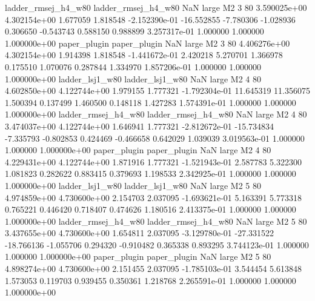 ladder_rmsej_h4_w80 ladder_rmsej_h4_w80                   NaN      large       M2                 3 80 3.590025e+00   4.302154e+00      1.677059       1.818548 -2.152390e-01    -16.552855     -7.780306    -1.028936       0.306650 -0.543743   0.588150     0.988899   3.257317e-01            1.000000        1.000000        1.000000e+00
       paper_plugin        paper_plugin                   NaN      large       M2                 3 80 4.406276e+00   4.302154e+00      1.914398       1.818548 -1.441672e-01      2.420218      5.270701     1.366978       0.175510  1.070076   0.287844     1.334970   1.857206e-01            1.000000        1.000000        1.000000e+00
    ladder_lsj1_w80     ladder_lsj1_w80                   NaN      large       M2                 4 80 4.602850e+00   4.122744e+00      1.979155       1.777321 -1.792304e-01     11.645319     11.356075     1.500394       0.137499  1.460500   0.148118     1.427283   1.574391e-01            1.000000        1.000000        1.000000e+00
ladder_rmsej_h4_w80 ladder_rmsej_h4_w80                   NaN      large       M2                 4 80 3.474037e+00   4.122744e+00      1.646941       1.777321 -2.812672e-01    -15.734834     -7.335793    -0.802853       0.424469 -0.466658   0.642029     1.039039   3.019563e-01            1.000000        1.000000        1.000000e+00
       paper_plugin        paper_plugin                   NaN      large       M2                 4 80 4.229431e+00   4.122744e+00      1.871916       1.777321 -1.521943e-01      2.587783      5.322300     1.081823       0.282622  0.883415   0.379693     1.198533   2.342925e-01            1.000000        1.000000        1.000000e+00
    ladder_lsj1_w80     ladder_lsj1_w80                   NaN      large       M2                 5 80 4.974859e+00   4.730600e+00      2.154703       2.037095 -1.693621e-01      5.163391      5.773318     0.765221       0.446420  0.718407   0.474626     1.180516   2.413375e-01            1.000000        1.000000        1.000000e+00
ladder_rmsej_h4_w80 ladder_rmsej_h4_w80                   NaN      large       M2                 5 80 3.437655e+00   4.730600e+00      1.654811       2.037095 -3.129780e-01    -27.331522    -18.766136    -1.055706       0.294320 -0.910482   0.365338     0.893295   3.744123e-01            1.000000        1.000000        1.000000e+00
       paper_plugin        paper_plugin                   NaN      large       M2                 5 80 4.898274e+00   4.730600e+00      2.151455       2.037095 -1.785103e-01      3.544454      5.613848     1.573053       0.119703  0.939455   0.350361     1.218768   2.265591e-01            1.000000        1.000000        1.000000e+00

